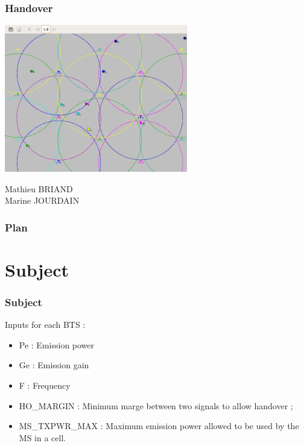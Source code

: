 \documentclass{beamer}
\begin{document}
\begin{frame}
\frametitle{Handover}
\begin{center}
  \includegraphics[width=0.6\textwidth]{./images/capture.png}
\end{center}

Mathieu BRIAND \\
Marine JOURDAIN

\end{frame}


\begin{frame}
\frametitle{Plan}
\tableofcontents

\end{frame}

\section{Subject}

\begin{frame}
\frametitle{Subject}
Inputs for each BTS :
\begin{itemize}
  \item Pe : Emission power
  \item Ge : Emission gain
  \item F : Frequency
  \item HO\_MARGIN : Minimum marge between two signals to allow handover ;
  \item MS\_TXPWR\_MAX : Maximum emission power allowed to be used by the MS in a cell.
\end{itemize}

\end{frame}
\end{document}

